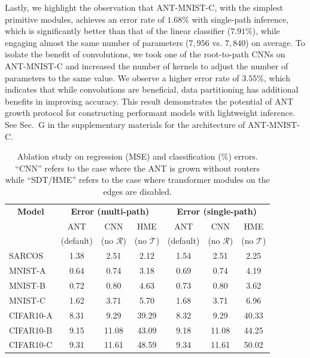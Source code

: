 Lastly, we highlight the observation that ANT-MNIST-C, with the simplest primitive modules, achieves an error rate of $1.68\%$ with single-path inference, which is significantly better than that of the linear classifier ($7.91\%$), while engaging almost the same number of parameters ($7,956$ vs. $7,840$) on average. To isolate the benefit of convolutions, we took one of the root-to-path CNNs on ANT-MNIST-C and increased the number of kernels to adjust the number of parameters to the same value. We observe a higher error rate of $3.55\%$, which indicates that while convolutions are beneficial, data partitioning has additional benefits in improving accuracy. This result demonstrates the potential of ANT growth protocol for constructing performant models with lightweight inference. See Sec.~G in the supplementary materials for the architecture of ANT-MNIST-C.

\begin{table}[t]
	\caption{\footnotesize Ablation study on regression (MSE) and classification ($\%$) errors. ``CNN'' refers to the case where the ANT is grown without routers while ``SDT/HME'' refers to the case where transformer modules on the edges are disabled.} \label{tab:ablationstudy}
	\footnotesize
    \center
	\begin{tabular}{|l|ccc|ccc|}
		\hline
		\multicolumn{1}{|c}{\textbf{Model}} &  \multicolumn{3}{|c|}{\textbf{Error (multi-path)}} & \multicolumn{3}{c|}{\textbf{Error (single-path)}}  \\
			& ANT & CNN & HME & ANT & CNN & HME  \\
			& (default) & (no $\mathcal{R}$) & (no $\mathcal{T}$) & (default) & (no $\mathcal{R}$) & (no $\mathcal{T}$) \\
		\hline
		SARCOS &1.38 & 2.51 & 2.12 &1.54 & 2.51 & 2.25 \\
		MNIST-A &0.64 & 0.74 & 3.18 &0.69 & 0.74 & 4.19  \\
	    MNIST-B &0.72 & 0.80 & 4.63 &0.73 & 0.80 & 3.62\\
        MNIST-C &1.62 & 3.71 & 5.70 &1.68 & 3.71 & 6.96 \\
		CIFAR10-A &8.31 & 9.29 & 39.29   & 8.32 & 9.29 & 40.33 \\
        CIFAR10-B &9.15 & 11.08 & 43.09 & 9.18 & 11.08 & 44.25 \\
        CIFAR10-C &9.31 & 11.61 & 48.59 & 9.34 & 11.61 & 50.02 \\
		\hline
	\end{tabular}
\end{table}

